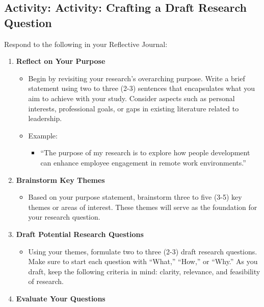 \documentclass[
  letterpaper,
  DIV=11,
  numbers=noendperiod]{scrreprt}
\providecommand{\tightlist}{%
  \setlength{\itemsep}{0pt}\setlength{\parskip}{0pt}}\usepackage{longtable,booktabs,array}
\begin{document}
\subsection*{Activity: Activity: Crafting a Draft Research
Question}\label{activity-activity-crafting-a-draft-research-question}

Respond to the following in your Reflective Journal:

\begin{enumerate}
\def\labelenumi{\arabic{enumi}.}
\tightlist
\item
  \textbf{Reflect on Your Purpose}

  \begin{itemize}
  \tightlist
  \item
    Begin by revisiting your research's overarching purpose. Write a
    brief statement using two to three (2-3) sentences that encapsulates
    what you aim to achieve with your study. Consider aspects such as
    personal interests, professional goals, or gaps in existing
    literature related to leadership.
  \item
    Example:

    \begin{itemize}
    \tightlist
    \item
      ``The purpose of my research is to explore how people development
      can enhance employee engagement in remote work environments.''
    \end{itemize}
  \end{itemize}
\item
  \textbf{Brainstorm Key Themes}

  \begin{itemize}
  \tightlist
  \item
    Based on your purpose statement, brainstorm three to five (3-5) key
    themes or areas of interest. These themes will serve as the
    foundation for your research question.
  \end{itemize}
\item
  \textbf{Draft Potential Research Questions}

  \begin{itemize}
  \tightlist
  \item
    Using your themes, formulate two to three (2-3) draft research
    questions. Make sure to start each question with ``What,'' ``How,''
    or ``Why.'' As you draft, keep the following criteria in mind:
    clarity, relevance, and feasibility of research.
  \end{itemize}
\item
  \textbf{Evaluate Your Questions}


\end{enumerate}
\end{document}
